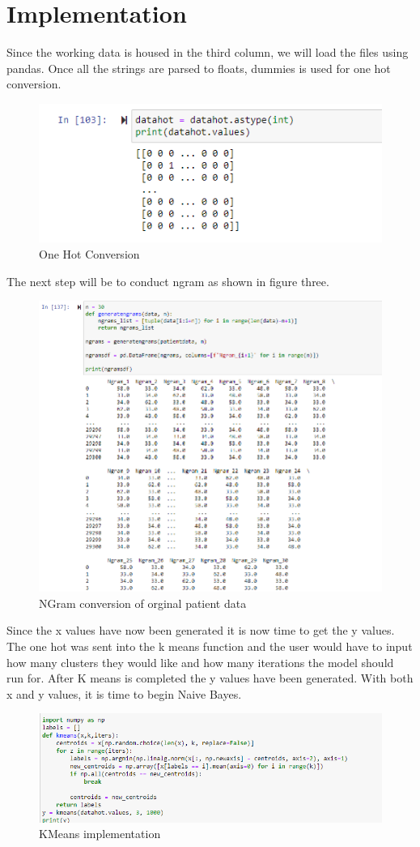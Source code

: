 \documentclass{article}
\begin{document}
\section{Implementation}
Since the working data is housed in the third column, we will load the files using pandas. Once all the strings are parsed to floats, dummies is used for one hot conversion. 
\begin{figure}
    \centering
    \includegraphics[width=0.5\linewidth]{2.png}
    \caption{One Hot Conversion}
    \label{fig:enter-label}
\end{figure}
The next step will be to conduct ngram as shown in figure three. 
\begin{figure}
    \centering
    \includegraphics[width=0.5\linewidth]{3.png}
    \caption{NGram conversion of orginal patient data}
    \label{fig:enter-label}
\end{figure}
Since the x values have now been generated it is now time to get the y values. The one hot was sent into the k means function and the user would have to input how many clusters they would like and how many iterations the model should run for. After K means is completed the y values have been generated. With both x and y values, it is time to begin Naive Bayes. 
\begin{figure}
    \centering
    \includegraphics[width=0.5\linewidth]{4.png}
    \caption{KMeans implementation}
    \label{fig:enter-label}
\end{figure}
\end{document}
